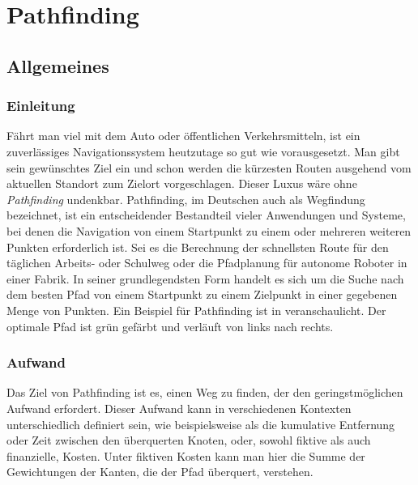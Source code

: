 \chapter{Pathfinding}

    \section{Allgemeines}
    
        \subsection{Einleitung}
    
            Fährt man viel mit dem Auto oder öffentlichen Verkehrsmitteln, ist ein zuverlässiges Navigationssystem heutzutage so gut wie vorausgesetzt. Man gibt sein gewünschtes Ziel ein und schon werden die kürzesten Routen ausgehend vom aktuellen Standort zum Zielort vorgeschlagen. Dieser Luxus wäre ohne \emph{Pathfinding} undenkbar. Pathfinding, im Deutschen auch als Wegfindung bezeichnet, ist ein entscheidender Bestandteil vieler Anwendungen und Systeme, bei denen die Navigation von einem Startpunkt zu einem oder mehreren weiteren Punkten erforderlich ist. Sei es die Berechnung der schnellsten Route für den täglichen Arbeits- oder Schulweg oder die Pfadplanung für autonome Roboter in einer Fabrik. In seiner grundlegendsten Form handelt es sich um die Suche nach dem besten Pfad von einem Startpunkt zu einem Zielpunkt in einer gegebenen Menge von Punkten. Ein Beispiel für Pathfinding ist in  veranschaulicht. Der optimale Pfad ist grün gefärbt und verläuft von links nach rechts. \cite{EZ:Web01}

        \subsection{Aufwand}
        
            Das Ziel von Pathfinding ist es, einen Weg zu finden, der den geringstmöglichen Aufwand erfordert. Dieser Aufwand kann in verschiedenen Kontexten unterschiedlich definiert sein, wie beispielsweise als die kumulative Entfernung oder Zeit zwischen den überquerten Knoten, oder, sowohl fiktive als auch finanzielle, Kosten. Unter fiktiven Kosten kann man hier \zb die Summe der Gewichtungen der Kanten, die der Pfad überquert, verstehen.
            
